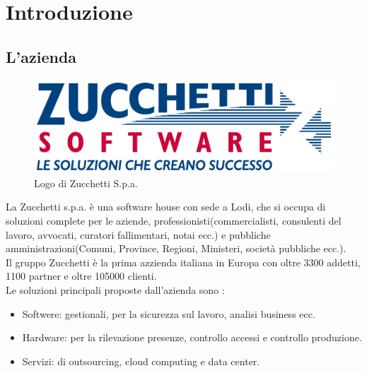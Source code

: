 
\chapter{Introduzione}
\label{cap:introduzione}

\section{L'azienda}

\begin{figure}[htp]
\centering
\includegraphics[width=\textwidth/2]{../immagini/logo_zucchetti}
\caption{Logo di Zucchetti S.p.a.}
\end{figure}

La Zucchetti s.p.a. è una software house con sede a Lodi, che si occupa di soluzioni complete per le aziende, professionisti(commercialisti, consulenti del lavoro, avvocati, curatori fallimentari, notai ecc.) e pubbliche amministrazioni(Comuni, Province, Regioni, Ministeri, società pubbliche ecc.).\\
Il gruppo Zucchetti è la prima azzienda italiana in Europa con oltre 3300 addetti, 1100 partner e oltre 105000 clienti.\\
Le soluzioni principali proposte dall'azienda sono :\\
\begin{itemize}
\item Softwere: gestionali, per la sicurezza sul lavoro, analisi business ecc.
\item Hardware: per la rilevazione presenze, controllo accessi e controllo produzione.
\item Servizi: di outsourcing, cloud computing e data center.
\end{itemize}

